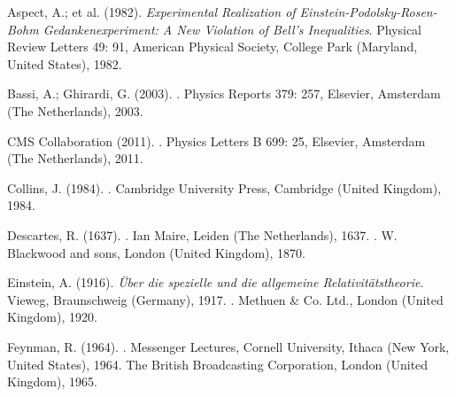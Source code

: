 \documentclass[10pt,a4paper,twoside,openany]{book}
\begin{document}
\backmatter

\begin{thebibliography}{99}

 Aspect, A.; et al. (1982). \textit{Experimental Realization of Einstein-Podolsky-Rosen-Bohm Gedankenexperiment: A New Violation of Bell's Inequalities}. Physical Review Letters 49: 91, American Physical Society, College Park (Maryland, United States), 1982.

 Bassi, A.; Ghirardi, G. (2003). . Physics Reports 379: 257, Elsevier, Amsterdam (The Netherlands), 2003.

 CMS Collaboration (2011). . Physics Letters B 699: 25, Elsevier, Amsterdam (The Netherlands), 2011.

 Collins, J. (1984). . Cambridge University Press, Cambridge (United Kingdom), 1984.

 Descartes, R. (1637). . Ian Maire, Leiden (The Netherlands), 1637. . W. Blackwood and sons, London (United Kingdom), 1870.

 Einstein, A. (1916). \textit{Über die spezielle und die allgemeine Relativitätstheorie}. Vieweg, Braunschweig (Germany), 1917. . Methuen \& Co. Ltd., London (United Kingdom), 1920.

 Feynman, R. (1964). . Messenger Lectures, Cornell University, Ithaca (New York, United States), 1964. The British Broadcasting Corporation, London (United Kingdom), 1965.


\end{thebibliography}
\end{document}
